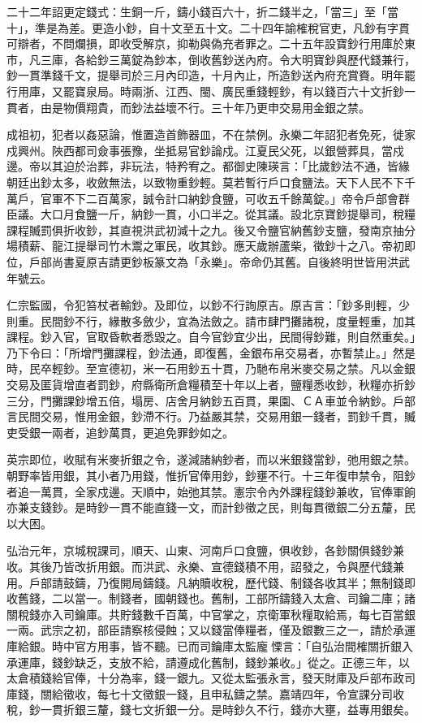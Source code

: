 二十二年詔更定錢式：生銅一斤，鑄小錢百六十，折二錢半之，「當三」至「當十」，準是為差。更造小鈔，自十文至五十文。二十四年諭榷稅官吏，凡鈔有字貫可辯者，不問爛損，即收受解京，抑勒與偽充者罪之。二十五年設寶鈔行用庫於東市，凡三庫，各給鈔三萬錠為鈔本，倒收舊鈔送內府。令大明寶鈔與歷代錢兼行，鈔一貫準錢千文，提舉司於三月內印造，十月內止，所造鈔送內府充賞賚。明年罷行用庫，又罷寶泉局。時兩浙、江西、閩、廣民重錢輕鈔，有以錢百六十文折鈔一貫者，由是物價翔貴，而鈔法益壞不行。三十年乃更申交易用金銀之禁。

成祖初，犯者以姦惡論，惟置造首飾器皿，不在禁例。永樂二年詔犯者免死，徙家戍興州。陜西都司僉事張豫，坐抵易官鈔論戍。江夏民父死，以銀營葬具，當戍邊。帝以其迫於治葬，非玩法，特矜宥之。都御史陳瑛言：「比歲鈔法不通，皆緣朝廷出鈔太多，收斂無法，以致物重鈔輕。莫若暫行戶口食鹽法。天下人民不下千萬戶，官軍不下二百萬家，誠令計口納鈔食鹽，可收五千餘萬錠。」帝令戶部會群臣議。大口月食鹽一斤，納鈔一貫，小口半之。從其議。設北京寶鈔提舉司，稅糧課程贓罰俱折收鈔，其直視洪武初減十之九。後又令鹽官納舊鈔支鹽，發南京抽分場積薪、龍江提舉司竹木鬻之軍民，收其鈔。應天歲辦蘆柴，徵鈔十之八。帝初即位，戶部尚書夏原吉請更鈔板篆文為「永樂」。帝命仍其舊。自後終明世皆用洪武年號云。

仁宗監國，令犯笞杖者輸鈔。及即位，以鈔不行詢原吉。原吉言：「鈔多則輕，少則重。民間鈔不行，緣散多斂少，宜為法斂之。請市肆門攤諸稅，度量輕重，加其課程。鈔入官，官取昏軟者悉毀之。自今官鈔宜少出，民間得鈔難，則自然重矣。」乃下令曰：「所增門攤課程，鈔法通，即復舊，金銀布帛交易者，亦暫禁止。」然是時，民卒輕鈔。至宣德初，米一石用鈔五十貫，乃馳布帛米麥交易之禁。凡以金銀交易及匿貨增直者罰鈔，府縣衛所倉糧積至十年以上者，鹽糧悉收鈔，秋糧亦折鈔三分，門攤課鈔增五倍，塌房、店舍月納鈔五百貫，果園、ＣＡ車並令納鈔。戶部言民間交易，惟用金銀，鈔滯不行。乃益嚴其禁，交易用銀一錢者，罰鈔千貫，贓吏受銀一兩者，追鈔萬貫，更追免罪鈔如之。

英宗即位，收賦有米麥折銀之令，遂減諸納鈔者，而以米銀錢當鈔，弛用銀之禁。朝野率皆用銀，其小者乃用錢，惟折官俸用鈔，鈔壅不行。十三年復申禁令，阻鈔者追一萬貫，全家戍邊。天順中，始弛其禁。憲宗令內外課程錢鈔兼收，官俸軍餉亦兼支錢鈔。是時鈔一貫不能直錢一文，而計鈔徵之民，則每貫徵銀二分五釐，民以大困。

弘治元年，京城稅課司，順天、山東、河南戶口食鹽，俱收鈔，各鈔關俱錢鈔兼收。其後乃皆改折用銀。而洪武、永樂、宣德錢積不用，詔發之，令與歷代錢兼用。戶部請鼓鑄，乃復開局鑄錢。凡納贖收稅，歷代錢、制錢各收其半；無制錢即收舊錢，二以當一。制錢者，國朝錢也。舊制，工部所鑄錢入太倉、司鑰二庫；諸關稅錢亦入司鑰庫。共貯錢數千百萬，中官掌之，京衛軍秋糧取給焉，每七百當銀一兩。武宗之初，部臣請察核侵蝕；又以錢當俸糧者，僅及銀數三之一，請於承運庫給銀。時中官方用事，皆不聽。已而司鑰庫太監龐慄言：「自弘治間榷關折銀入承運庫，錢鈔缺乏，支放不給，請遵成化舊制，錢鈔兼收。」從之。正德三年，以太倉積錢給官俸，十分為率，錢一銀九。又從太監張永言，發天財庫及戶部布政司庫錢，關給徵收，每七十文徵銀一錢，且申私鑄之禁。嘉靖四年，令宣課分司收稅，鈔一貫折銀三釐，錢七文折銀一分。是時鈔久不行，錢亦大壅，益專用銀矣。

